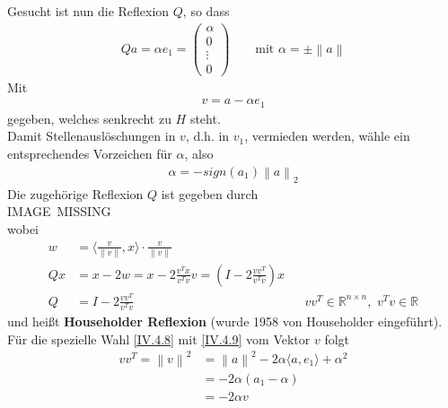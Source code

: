 \documentclass[ngerman,fontsize=11pt, paper=a4, parskip=half, titlepage=true, toc=bib]{scrbook}
\newcommand{\R}{\mathds{R}}
\newcommand{\Renn}{\mathds{R}^{n\times n}}
\newcommand{\nn}[1]{\left\| #1 \right\|}
\newcommand{\scp}[2]{\langle #1, #2 \rangle}
\begin{document}
	Gesucht ist nun die Reflexion $Q$, so dass
	\begin{gather*}
		Qa = \alpha e_1 = \begin{pmatrix} \alpha \\ 0\\\vdots\\0\end{pmatrix}
		\qquad \text{mit } \alpha = \pm \nn{a}
	\end{gather*}
	Mit \begin{gather}
		v=a-\alpha e_1 
		\label{IV.4.8}
	\end{gather}
	gegeben, welches senkrecht zu $H$ steht.\\
	Damit Stellenauslöschungen in $v$, d.h. in $v_1$, vermieden werden,
	wähle ein entsprechendes Vorzeichen für $\alpha$, also 
	\begin{gather}
		\alpha = -sign(a_1)\nn{a}_2 
		\label{IV.4.9}
	\end{gather}
	Die zugehörige Reflexion $Q$ ist  gegeben durch \\
	
	IMAGE~MISSING \\
	
	wobei
	\begin{align}
	\nonumber
		w &= \scp{\frac{v}{\nn{v}}}{x} \cdot \frac{v}{\nn{v}} \\ %
		Qx &= x-2w = x-2\frac{v^Tx}{v^Tv}v 
			 = (I-2\frac{vv^T}{v^Tv})x 
			 \label{VI.4.10}\\
	    Q  &= I-2\frac{vv^T}{v^Tv}&& vv^T \in \Renn,\,\, v^Tv\in\R
	    	\label{VI.4.11}
	\end{align}
	und heißt \textbf{Householder Reflexion} 
	 (wurde  1958 von Householder eingeführt).  \\
	 Für die spezielle Wahl \eqref{IV.4.8} mit \eqref{IV.4.9} vom Vektor $v$ folgt
	 \begin{align}\nonumber
	 	vv^T = \nn{v}^2 &= \nn{a}^2 - 2\alpha\scp{a}{e_1} + \alpha^2 \\ \nonumber
	 	&= -2\alpha(a_1-\alpha) \\
	 	& = -2\alpha v
	 	\label{IV.4.12}
	 \end{align}
	
	
\end{document}
